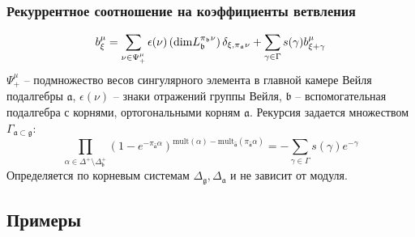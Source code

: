 \documentclass[pdftex]{beamer}
\newcommand{\gf}{\mathfrak{g}}
\newcommand{\gfh}{\hat{\mathfrak{g}}}
\newcommand{\af}{\mathfrak{a}}
\newcommand{\afh}{\hat{\mathfrak{a}}}
\newcommand{\bff}{\mathfrak{b}}
\theoremstyle{definition} \newtheorem{Def}{Определение}
\begin{document}
\begin{frame}
  \frametitle{Рекуррентное соотношение на коэффициенты ветвления}
  \begin{equation*}
    b_{\xi }^{ \mu } =  \sum_{\nu\in \Psi^{\mu}_{+}} \epsilon (\nu)\left(\mathrm{dim}L_{\mathfrak{b}}^{\pi_{ \frak{b} }\nu }\right)
  \delta_{\xi,\pi_{\af}\nu}+\sum_{\gamma\in \Gamma}s(\gamma) b^{\mu}_{\xi+\gamma}
\end{equation*}
 $\Psi^{\mu}_{+}$ -- подмножество весов сингулярного элемента в главной камере Вейля подалгебры $\af$, $\epsilon(\nu)$ -- знаки отражений группы Вейля, $\bff$ -- вспомогательная подалгебра с корнями, ортогональными корням $\af$.
Рекурсия задается множеством $\Gamma _{\af\subset \gf}$:
\begin{equation*}
\prod_{\alpha \in \Delta ^{+}\setminus \Delta _{\mathfrak{b} }^{+}}\left( 1-e^{-\pi
_{\afh}\alpha }\right) ^{\mathrm{mult}(\alpha )-\mathrm{mult}_{\afh}(\pi _{\afh}\alpha )}=-\sum_{\gamma \in \Gamma}s(\gamma )e^{-\gamma }
\end{equation*}
Определяется по корневым системам $\Delta_{\gf}, \Delta_{\af}$ и не зависит от модуля.
\end{frame}
\subsection{Примеры}
\end{document}

